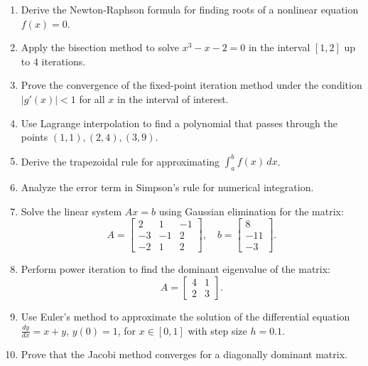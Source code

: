 \documentclass{article}
\begin{document}
\begin{enumerate}
    \item Derive the Newton-Raphson formula for finding roots of a nonlinear equation \( f(x) = 0 \).

    \item Apply the bisection method to solve \( x^3 - x - 2 = 0 \) in the interval \( [1, 2] \) up to 4 iterations.

    \item Prove the convergence of the fixed-point iteration method under the condition \( |g'(x)| < 1 \) for all \( x \) in the interval of interest.

    \item Use Lagrange interpolation to find a polynomial that passes through the points \( (1, 1), (2, 4), (3, 9) \).

    \item Derive the trapezoidal rule for approximating \( \int_a^b f(x) \, dx \).

    \item Analyze the error term in Simpson's rule for numerical integration.

    \item Solve the linear system \( Ax = b \) using Gaussian elimination for the matrix:
    \[
    A = \begin{bmatrix} 2 & 1 & -1 \\ -3 & -1 & 2 \\ -2 & 1 & 2 \end{bmatrix}, \quad b = \begin{bmatrix} 8 \\ -11 \\ -3 \end{bmatrix}.
    \]

    \item Perform power iteration to find the dominant eigenvalue of the matrix:
    \[
    A = \begin{bmatrix} 4 & 1 \\ 2 & 3 \end{bmatrix}.
    \]

    \item Use Euler's method to approximate the solution of the differential equation \( \frac{dy}{dx} = x + y \), \( y(0) = 1 \), for \( x \in [0, 1] \) with step size \( h = 0.1 \).

    \item Prove that the Jacobi method converges for a diagonally dominant matrix.
\end{enumerate}
\end{document}
